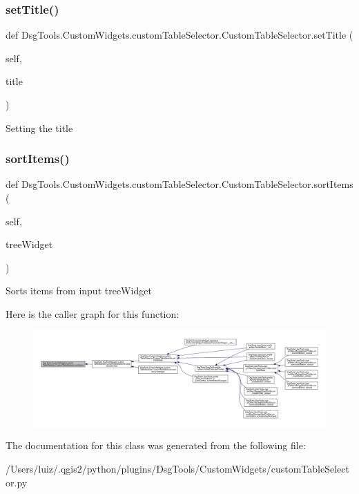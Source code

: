 \subsubsection{\texorpdfstring{set\+Title()}{setTitle()}}
{\footnotesize\ttfamily def Dsg\+Tools.\+Custom\+Widgets.\+custom\+Table\+Selector.\+Custom\+Table\+Selector.\+set\+Title (\begin{DoxyParamCaption}\item[{}]{self,  }\item[{}]{title }\end{DoxyParamCaption})}

\begin{DoxyVerb}Setting the title
\end{DoxyVerb}
 \mbox{\label{class_dsg_tools_1_1_custom_widgets_1_1custom_table_selector_1_1_custom_table_selector_a4578d03da93bb096730737ce3058b426}} 
\subsubsection{\texorpdfstring{sort\+Items()}{sortItems()}}
{\footnotesize\ttfamily def Dsg\+Tools.\+Custom\+Widgets.\+custom\+Table\+Selector.\+Custom\+Table\+Selector.\+sort\+Items (\begin{DoxyParamCaption}\item[{}]{self,  }\item[{}]{tree\+Widget }\end{DoxyParamCaption})}

\begin{DoxyVerb}Sorts items from input treeWidget
\end{DoxyVerb}
 Here is the caller graph for this function\+:
\nopagebreak
\begin{figure}[H]
\begin{center}
\leavevmode
\includegraphics[width=350pt]{class_dsg_tools_1_1_custom_widgets_1_1custom_table_selector_1_1_custom_table_selector_a4578d03da93bb096730737ce3058b426_icgraph}
\end{center}
\end{figure}


The documentation for this class was generated from the following file\+:\begin{DoxyCompactItemize}
\item 
/\+Users/luiz/.\+qgis2/python/plugins/\+Dsg\+Tools/\+Custom\+Widgets/custom\+Table\+Selector.\+py\end{DoxyCompactItemize}
